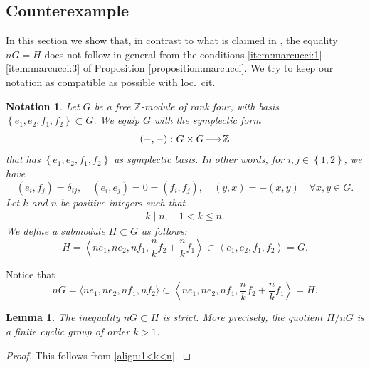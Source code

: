 \documentclass[a4paper,11pt,reqno]{amsart}
\makeatletter
\numberwithin{equation}{section}
\theoremstyle{plain}
\newtheorem{lemma}[theorem]{Lemma}
\newtheorem{notation}[theorem]{Notation}
\theoremstyle{definition}
\newcommand{\Z}{\mathbb Z}
\renewcommand{\longrightarrow}{\xymatrix@1@=15pt{\ar[r]&}}
\newcommand{\set}[1]{\left\{ #1 \right\}}
\makeatother
\begin{document}
\subsection{Counterexample}

In this section we show that, in contrast to what is claimed in \cite[Proposition 3.6]{marcucci-genusofcurves}, the equality $nG = H$ does not follow in general from the conditions \eqref{item:marcucci:1}--\eqref{item:marcucci:3} of Proposition \ref{proposition:marcucci}.  
We try to keep our notation as compatible as possible with loc.\ cit.

\begin{notation} \label{notation:marcucci}
    Let $G$ be a free $\Z$-module of rank four, with basis $\set{e_1, e_2, f_1, f_2} \subset G$. We equip $G$ with the symplectic form 
\[
\left(-, - \right) \colon G\times G \longrightarrow \Z 
\]
that has $\set{e_1, e_2, f_1, f_2}$ as symplectic basis. In other words, for $i,j \in \set{1,2}$, we have $$(e_i, f_j) = \delta_{ij}, \quad (e_i, e_j) = 0 = (f_i, f_j), \quad (y,x) = - (x,y) \quad \forall x,y\in G.$$  
Let $k$ and $n$ be positive integers such that \begin{align}\label{align:1<k<n}
k \mid n, \quad 1 < k \leq n.
\end{align}
We define a submodule $H \subset G$ as follows:
\[
H = \left\langle ne_1, ne_2, nf_1, \frac{n}{k}f_2 + \frac{n}{k}f_1 \right\rangle \subset \left\langle e_1, e_2, f_1, f_2 \right\rangle = G. 
\]
\end{notation}
Notice that
\[
nG = \langle ne_1, ne_2, nf_1, nf_2\rangle 
\subset 
\left\langle ne_1, ne_2, nf_1, \frac{n}{k}f_2 + \frac{n}{k}f_1 \right\rangle = H. 
\]
\begin{lemma} \label{lemma:strict-inequality}
    The inequality $nG \subset H$ is strict. More precisely, the quotient $H/nG$ is a finite cyclic group of order $k > 1$. 
\end{lemma}
\begin{proof}
    This follows from \eqref{align:1<k<n}. 
\end{proof}
\end{document}
